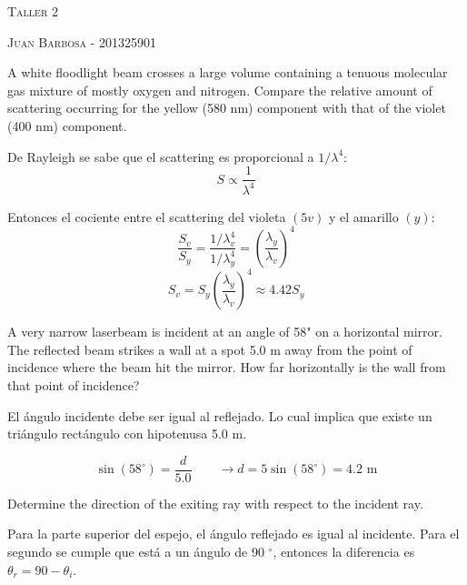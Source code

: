 \documentclass[addpoints,10pt]{exam}
\begin{document}
	\begin{center}
		\LARGE\scshape{Taller 2}
		
		\vspace{1cm}
		\large\scshape{Juan Barbosa - 201325901}
	\end{center}

	\begin{questions}
		{
			\question
			A white floodlight beam crosses a large volume containing a tenuous molecular gas mixture of mostly oxygen and nitrogen. Compare the relative amount of scattering occurring for the yellow (580 nm) component with that of the violet (400 nm) component.
		}
		
		De Rayleigh se sabe que el scattering es proporcional a $1/\lambda^4$:
		\begin{equation}
			S \propto \dfrac{1}{\lambda^4}
		\end{equation}
		
		Entonces el cociente entre el scattering del violeta $(5v)$ y el amarillo $(y)$:
		\begin{equation}
			\dfrac{S_v}{S_y} = \dfrac{1/\lambda_v^4}{1/\lambda_y^4} = \left(\dfrac{\lambda_y}{\lambda_v}\right)^4
		\end{equation}
		\begin{equation}
			S_v = S_y\left(\dfrac{\lambda_y}{\lambda_v}\right)^4 \approx 4.42S_y
		\end{equation}
		
		{
			\question
			A very narrow laserbeam is incident at an angle of 58" on a horizontal mirror. The reflected beam strikes a wall at a spot 5.0 m away from the point of incidence where the beam hit the mirror. How far	horizontally is the wall from that point of incidence?
		}
		
		El \'angulo incidente debe ser igual al reflejado. Lo cual implica que existe un tri\'angulo rect\'angulo con hipotenusa 5.0 m.
		
		\begin{equation}
		\sin(58^\circ) = \dfrac{d}{5.0} \qquad \longrightarrow d = 5\sin(58^\circ) = 4.2\text{ m}
		\end{equation}
		
		{
			\question
			Determine the direction of the exiting ray with respect to the incident ray.
		}
		
		Para la parte superior del espejo, el \'angulo reflejado es igual al incidente. Para el segundo se cumple que est\'a a un \'angulo de 90 $^\circ$, entonces la diferencia es $\theta_r = 90 - \theta_i$.
		

\end{questions}
\end{document}
